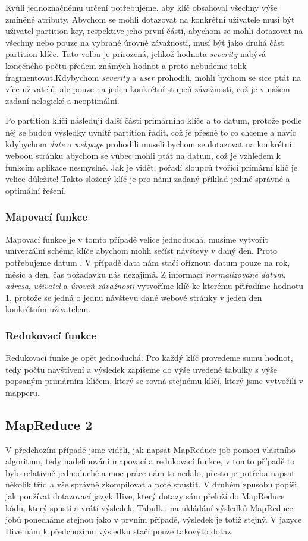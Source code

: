 Kvůli jednoznačnému určení potřebujeme, aby klíč obsahoval všechny výše zmíněné atributy. Abychom se mohli dotazovat na konkrétní uživatele musí být uživatel partition key, respektive jeho první částí, abychom se mohli dotazovat na všechny nebo pouze na vybrané úrovně závažnosti, musí být jako druhá část partition klíče. Tato volba je prirozená, jelikož hodnota \emph{severity} nabývá konečného počtu předem známých hodnot a proto nebudeme tolik fragmentovat.Kdybychom \emph{severity} a \emph{user} prohodili, mohli bychom se sice ptát na více uživatelů, ale pouze na jeden konkrétní  stupeň závažnosti, což je v našem zadaní nelogické a neoptimální.

Po partition klíči následují další části primárního klíče a to datum, protože podle něj se budou výsledky uvnitř partition řadit, což je přesně to co chceme a navíc kdybychom \emph{date} a \emph{webpage} prohodili museli bychom se dotazovat na konkrétní weboou stránku abychom se vůbec mohli ptát na datum, což je vzhledem k funkcím aplikace nesmyslné. Jak je vidět, pořadí sloupců tvořící primární klíč je velice důležite! Takto složený klíč je pro námi zadaný příklad jediné správné a optimální řešení.

\subsubsection{Mapovací funkce}
Mapovací funkce je v tomto případě velice jednoduchá, musíme vytvořit univerzální schéma klíče abychom mohli sečíst návštevy v daný den. Proto potřebujeme datum  . V případě data nám stačí oříznout datum pouze na rok, měsíc a den. čas požadavku nás nezajímá. Z informací \emph{normalizovane datum}, \emph{adresa}, \emph{uživatel} a \emph{úroveň závažnosti} vytvoříme klíč ke kterému přiřadíme hodnotu 1, protože se jedná o jednu návštevu dané webové stránky v jeden den konkrétním uživatelem. 

\subsubsection{Redukovací funkce}
Redukovací funke je opět jednoduchá. Pro každý klíč provedeme sumu hodnot, tedy počtu navštívení a výsledek zapíšeme do výše uvedené tabulky s výše popsaným primárním klíčem, který se rovná stejnému klíčí, který jsme vytvořili v mapperu. 

\subsection{MapReduce 2}
V předchozím případě jsme viděli, jak napsat MapReduce job pomocí vlastního algoritmu, tedy nadefinování mapovací a redukovací funkce, v tomto případě to bylo relativně jednoduché a moc práce nám to nedalo, přesto je potřeba napsat několik tříd a vše správně zkompilovat a poté spustit. V druhém způsobu popíši, jak používat dotazovací jazyk Hive, který dotazy sám přeloží do MapReduce kódu, který spustí a vrátí výsledek. Tabulku na ukládání výsledků MapReduce jobů ponecháme stejnou jako v prvním případě, výsledek je totiž stejný. V jazyce Hive nám k předchozímu výsledku stačí pouze takovýto dotaz.

